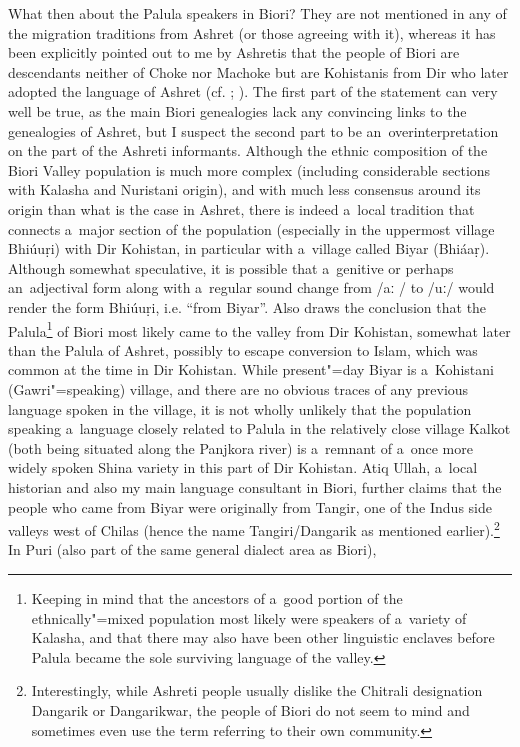 What then about the Palula speakers in Biori? They are not mentioned in any of the migration
traditions from Ashret (or those agreeing with it), whereas it has been explicitly pointed out to me
by Ashretis that the people of Biori are descendants neither of Choke nor Machoke but are Kohistanis
from Dir who later adopted the language of Ashret (cf. \citealt[255]{strand2001};
\citealt[296]{saeed2001}). The first part of the statement can very well be true, as the main Biori
genealogies lack any convincing links to the genealogies of Ashret, but I suspect the second part to
be an~overinterpretation on the part of the Ashreti informants. Although the ethnic composition of
the Biori Valley population is much more complex (including considerable sections with Kalasha and
Nuristani origin), and with much less consensus around its origin than what is the case in Ashret,
there is indeed a~local tradition that connects a~major section of the population (especially in the
uppermost village Bhiúuṛi) with Dir Kohistan, in particular with a~village called Biyar
(Bhiáaṛ). Although somewhat speculative, it is possible that a~genitive or perhaps an~adjectival
form along with a~regular sound change from ‌/aː / to /uː/ would render the form Bhiúuṛi,
i.e. ``from Biyar''. Also \citet[111--108]{cacopardo2001} draws the conclusion that the
Palula\footnote{Keeping in mind that the ancestors of a~good portion of the ethnically"=mixed
  population most likely were speakers of a~variety of Kalasha, and that there may also have been
  other linguistic enclaves before Palula became the sole surviving language of the valley.} of
Biori most likely came to the valley from Dir Kohistan, somewhat later than the Palula of Ashret,
possibly to escape conversion to Islam, which was common at the time in Dir Kohistan. While
present"=day Biyar is a~Kohistani (Gawri"=speaking) village, and there are no obvious traces of any
previous language spoken in the village, it is not wholly unlikely that the population speaking
a~language closely related to Palula in the relatively close village Kalkot (both being situated
along the Panjkora river) is a~remnant of a~once more widely spoken Shina variety in this part of
Dir Kohistan. Atiq Ullah, a~local historian and also my main language consultant in Biori, further
claims that the people who came from Biyar were originally from Tangir, one of the Indus side
valleys west of Chilas (hence the name Tangiri/Dangarik as mentioned
earlier).\footnote{Interestingly, while Ashreti people usually dislike the Chitrali designation
  Dangarik or Dangarikwar, the people of Biori do not seem to mind and sometimes even use the term
  referring to their own community.} In Puri (also part of the same general dialect area as Biori),
